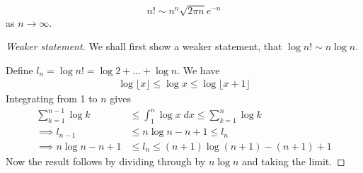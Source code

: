 \documentclass{../../template/note}
\begin{document}
    \begin{theorem}[Stirling]
        \[
            n! \sim n^n \sqrt{2\pi n} e^{-n}
        \]
        as \(n \to \infty\).        
    \end{theorem}
    
    \begin{proof}[Weaker statement]
        We shall first show a weaker statement, that \(\log n! \sim n \log n\).

        Define \(l_n = \log n! = \log 2 + \dots + \log n\). We have
        \begin{align*}
            \log \lfloor x \rfloor \leq \log x \leq \log \lfloor x+1 \rfloor
        \end{align*}
        Integrating from 1 to \(n\) gives
        \begin{align*}
            \sum_{k=1}^{n-1} \log k &\leq \int_1^n \log x \; dx \leq \sum_{k=1}^{n} \log k \\
            \implies l_{n-1} &\leq n \log n - n + 1 \leq l_n \\
            \implies n \log n - n + 1 &\leq l_n \leq (n+1) \log (n+1) - (n+1) + 1
        \end{align*}
        Now the result follows by dividing through by \(n \log n\) and taking the limit.
    \end{proof}
    
\end{document}
